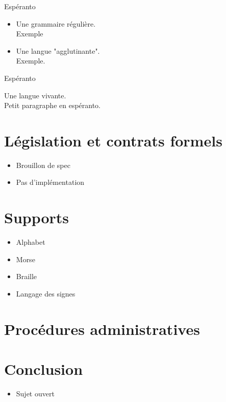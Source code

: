 \documentclass{beamer}
\begin{document}
\begin{frame}
\begin{center}
\huge Espéranto
\end{center}
\begin{itemize}
\item Une grammaire régulière.
\\ Exemple
\item Une langue "agglutinante".
\\ Exemple.
\end{itemize}
\end{frame}

\begin{frame}
\begin{center}
\huge Espéranto
\end{center}
Une langue vivante.
\\ Petit paragraphe en espéranto.
\end{frame}

\section[Contrats]{Législation et contrats formels}

\begin{frame}  
  \begin{itemize}
  \item Brouillon de spec
  \item Pas d'implémentation
  \end{itemize}
\end{frame}

\section{Supports}

\begin{frame}  
  \begin{itemize}
  \item Alphabet %
  \item Morse
  \item Braille
  \item Langage des signes
  \end{itemize}
\end{frame}

\section{Procédures administratives}

\begin{frame}
\end{frame}

\section{Conclusion}

\begin{frame}
  \begin{itemize}
  \item Sujet ouvert%
  \end{itemize}
\end{frame}
\end{document}
